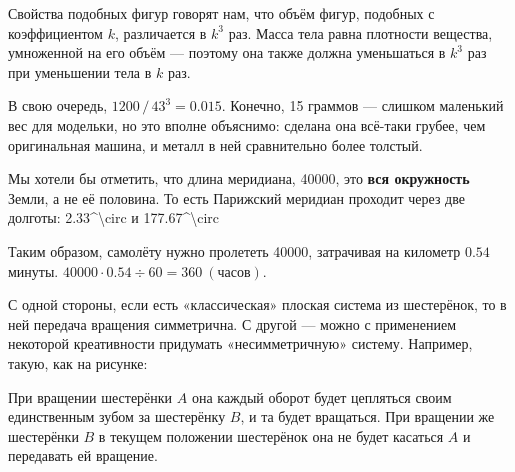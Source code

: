 \begin{itemize}
\itA Свойства подобных фигур говорят нам, что объём фигур, подобных с коэффициентом $k$, различается в $k^3$ раз. Масса тела равна плотности вещества, умноженной на его объём — поэтому она также должна уменьшаться в $k^3$ раз при уменьшении тела в $k$ раз.

В свою очередь, $1200\,/\,43^3 = 0.015$. Конечно, 15 граммов — слишком маленький вес для модельки, но это вполне объяснимо: сделана она всё-таки грубее, чем оригинальная машина, и металл в ней сравнительно более толстый.

\itB Мы хотели бы отметить, что длина меридиана, \SI{40000}{}, это {\bfseries вся окружность} Земли, а не её половина. То есть Парижский меридиан проходит через две долготы: \SI{2.33^\circ}{} и \SI{177.67^\circ}{}

Таким образом, самолёту нужно пролететь \SI{40000}{}, затрачивая на километр $0.54$ минуты. $40000 \cdot 0.54 \div 60 = \SI{360}{(\text{часов})}$.

\itC С одной стороны, если есть «классическая» плоская система из шестерёнок, то в ней передача вращения симметрична. С другой — можно с применением некоторой креативности придумать «несимметричную» систему. Например, такую, как на рисунке:

\begin{center}

\end{center}

При вращении шестерёнки $A$ она каждый оборот будет цепляться своим единственным зубом за шестерёнку $B$, и та будет вращаться. При вращении же шестерёнки $B$ в текущем положении шестерёнок она не будет касаться $A$ и передавать ей вращение.

\end{itemize}